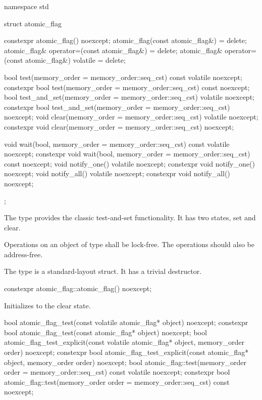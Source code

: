 \begin{codeblock}
namespace std {
  struct atomic_flag {
    constexpr atomic_flag() noexcept;
    atomic_flag(const atomic_flag&) = delete;
    atomic_flag& operator=(const atomic_flag&) = delete;
    atomic_flag& operator=(const atomic_flag&) volatile = delete;

    bool test(memory_order = memory_order::seq_cst) const volatile noexcept;
    constexpr bool test(memory_order = memory_order::seq_cst) const noexcept;
    bool test_and_set(memory_order = memory_order::seq_cst) volatile noexcept;
    constexpr bool test_and_set(memory_order = memory_order::seq_cst) noexcept;
    void clear(memory_order = memory_order::seq_cst) volatile noexcept;
    constexpr void clear(memory_order = memory_order::seq_cst) noexcept;

    void wait(bool, memory_order = memory_order::seq_cst) const volatile noexcept;
    constexpr void wait(bool, memory_order = memory_order::seq_cst) const noexcept;
    void notify_one() volatile noexcept;
    constexpr void notify_one() noexcept;
    void notify_all() volatile noexcept;
    constexpr void notify_all() noexcept;
  };
}
\end{codeblock}

\pnum
The  type provides the classic test-and-set functionality. It has two states, set and clear.

\pnum
Operations on an object of type  shall be lock-free.
The operations should also be address-free.

\pnum
The  type is a standard-layout struct.
It has a trivial destructor.

%
\begin{itemdecl}
constexpr atomic_flag::atomic_flag() noexcept;
\end{itemdecl}

\begin{itemdescr}
\pnum
\effects
Initializes  to the clear state.
\end{itemdescr}

%
%
%
\begin{itemdecl}
bool atomic_flag_test(const volatile atomic_flag* object) noexcept;
constexpr bool atomic_flag_test(const atomic_flag* object) noexcept;
bool atomic_flag_test_explicit(const volatile atomic_flag* object,
                               memory_order order) noexcept;
constexpr bool atomic_flag_test_explicit(const atomic_flag* object,
                               memory_order order) noexcept;
bool atomic_flag::test(memory_order order = memory_order::seq_cst) const volatile noexcept;
constexpr bool atomic_flag::test(memory_order order = memory_order::seq_cst) const noexcept;
\end{itemdecl}

